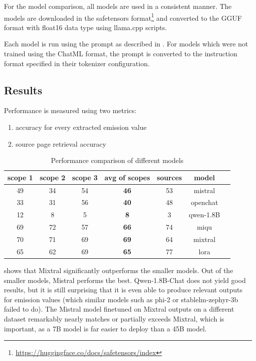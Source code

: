 \documentclass[]{article}
\begin{document}
For the model comparison, all models are used in a consistent manner. The models are downloaded in the safetensors format\footnote{\url{https://huggingface.co/docs/safetensors/index}} and converted to the GGUF format with float16 data type using llama.cpp scripts.

Each model is run using the prompt as described in . For models which were not trained using the ChatML format, the prompt is converted to the instruction format specified in their tokenizer configuration.

\subsection{Results}

	Performance is measured using two metrics:
	\begin{enumerate}
		\item accuracy for every extracted emission value
		\item source page retrieval accuracy
	\end{enumerate}
	
	\begin{table}[h!]
		\centering
		\begin{tabular}{@{}ccccccc@{}}
			\toprule
			scope 1 & scope 2 & scope 3 & avg of scopes & sources & model \\ \midrule
			49 & 34 & 54 & \textbf{46} & 53 & mistral \\
			33 & 31 & 56 & \textbf{40} & 48 & openchat \\
			12 & 8 & 5 & \textbf{8} & 3 & qwen-1.8B \\
			69 & 72 & 57 & \textbf{66} & 74 & miqu \\
			70 & 71 & 69 & \textbf{69} & 64 & mixtral \\
			65 & 62 & 69 & \textbf{65} & 77 & lora \\ \bottomrule
		\end{tabular}
		\caption{Performance comparison of different models}
		\label{tab:performance}
	\end{table}
	
	 shows that Mixtral significantly outperforms the smaller models. Out of the smaller models, Mistral performs the best. Qwen-1.8B-Chat does not yield good results, but it is still surprising that it is even able to produce relevant outputs for emission values (which similar models such as phi-2 or stablelm-zephyr-3b failed to do). The Mistral model finetuned on Mixtral outputs on a different dataset remarkably nearly matches or partially exceeds Mixtral, which is important, as a 7B model is far easier to deploy than a 45B model.
	
\end{document}
